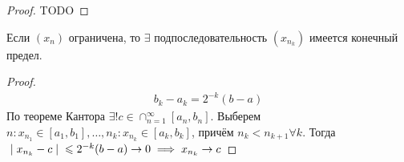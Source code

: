 \begin{proof}
   TODO 
\end{proof}
\begin{theorem}
    Если $ (x_n) $ ограничена, то $ \exists  $ подпоследовательность $ (x_{n_k}) $ имеется конечный предел.
\end{theorem}
\begin{proof}
    \begin{gather}
        b_k - a_k = 2^{ - k}(b - a)
    \end{gather}
    По теореме Кантора $ \exists ! c \in \cap_{n = 1}^\infty [a_n, b_n] $. Выберем $ n: x_{n_1}  \in [a_1, b_1], \dots , n_k : x_{n_k} \in [a_k, b_k]$, причём $ n_k < n_{k + 1} \forall k $.
    Тогда $ \;\vert\; x_{n_k} - c \;\vert\; \leqslant  2^{ - k}(b - a) \to  0 \implies  x_{n_k} \to c $
\end{proof}